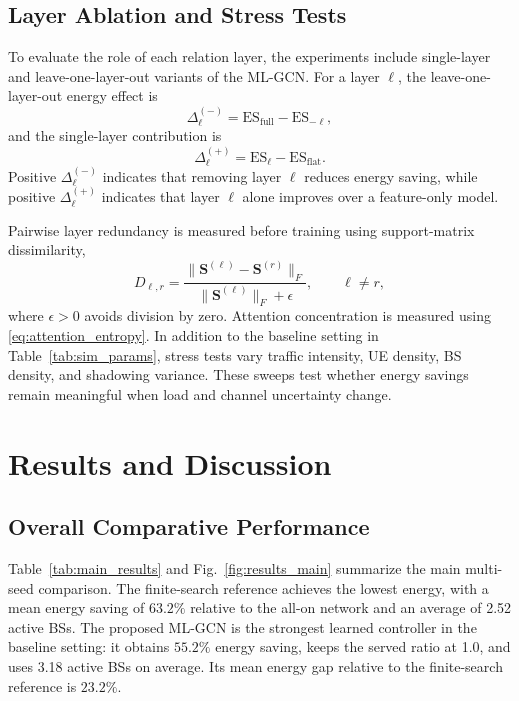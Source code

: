 \documentclass[journal]{IEEEtran}
\begin{document}
\subsection{Layer Ablation and Stress Tests}
To evaluate the role of each relation layer, the experiments include
single-layer and leave-one-layer-out variants of the ML-GCN. For a layer
$\ell$, the leave-one-layer-out energy effect is
\begin{equation}
    \Delta_{\ell}^{(-)}
    =
    \mathrm{ES}_{\mathrm{full}}
    -
    \mathrm{ES}_{-\ell},
    \label{eq:leave_one_out_metric}
\end{equation}
and the single-layer contribution is
\begin{equation}
    \Delta_{\ell}^{(+)}
    =
    \mathrm{ES}_{\ell}
    -
    \mathrm{ES}_{\mathrm{flat}}.
    \label{eq:single_layer_metric}
\end{equation}
Positive $\Delta_{\ell}^{(-)}$ indicates that removing layer $\ell$ reduces
energy saving, while positive $\Delta_{\ell}^{(+)}$ indicates that layer
$\ell$ alone improves over a feature-only model.

Pairwise layer redundancy is measured before training using support-matrix
dissimilarity,
\begin{equation}
    D_{\ell,r}
    =
    \frac{\|\mathbf{S}^{(\ell)}-\mathbf{S}^{(r)}\|_F}
    {\|\mathbf{S}^{(\ell)}\|_F+\epsilon},
    \qquad \ell\neq r,
    \label{eq:layer_dissimilarity}
\end{equation}
where $\epsilon>0$ avoids division by zero. Attention concentration is measured
using \eqref{eq:attention_entropy}. In addition to the baseline setting in
Table~\ref{tab:sim_params}, stress tests vary traffic intensity, UE density,
BS density, and shadowing variance. These sweeps test whether energy savings
remain meaningful when load and channel uncertainty change.

\section{Results and Discussion}
\subsection{Overall Comparative Performance}
Table~\ref{tab:main_results} and Fig.~\ref{fig:results_main} summarize the
main multi-seed comparison. The finite-search reference achieves the lowest
energy, with a mean energy saving of $63.2\%$ relative to the all-on network
and an average of 2.52 active BSs. The proposed ML-GCN is the strongest learned
controller in the baseline setting: it obtains $55.2\%$ energy saving, keeps
the served ratio at 1.0, and uses 3.18 active BSs on average. Its mean energy
gap relative to the finite-search reference is $23.2\%$.
\end{document}
